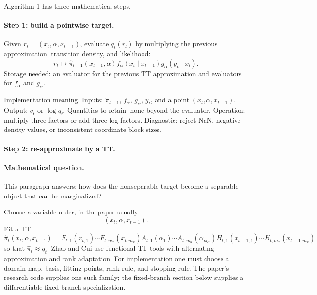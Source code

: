 \documentclass[11pt]{article}
\numberwithin{equation}{section}
\begin{document}
Algorithm 1 has three mathematical steps.

\paragraph{Step 1: build a pointwise target.}
Given \(r_t=(x_t,\alpha,x_{t-1})\), evaluate \(q_t(r_t)\) by multiplying the
previous approximation, transition density, and likelihood:
\[
    r_t\mapsto
    \widehat\pi_{t-1}(x_{t-1},\alpha)
    f_\alpha(x_t\mid x_{t-1})
    g_\alpha(y_t\mid x_t).
\]
Storage needed: an evaluator for the previous TT approximation and evaluators
for \(f_\alpha\) and \(g_\alpha\).

Implementation meaning. Inputs:
\(\widehat\pi_{t-1}\), \(f_\alpha\), \(g_\alpha\), \(y_t\), and a point
\((x_t,\alpha,x_{t-1})\).  Output: \(q_t\) or \(\log q_t\).  Quantities to retain:
none beyond the evaluator.  Operation: multiply three factors or add three log
factors.  Diagnostic: reject NaN, negative density values, or inconsistent
coordinate block sizes.

\paragraph{Step 2: re-approximate by a TT.}
\paragraph{Mathematical question.}
This paragraph answers: how does the nonseparable target become a separable
object that can be marginalized?

Choose a variable order, in the paper usually
\[
    (x_t,\alpha,x_{t-1}).
\]
Fit a TT
\begin{equation}
    \widehat\pi_t(x_t,\alpha,x_{t-1})
    =
    F_{t,1}(x_{t,1})\cdots F_{t,m_x}(x_{t,m_x})
    A_{t,1}(\alpha_1)\cdots A_{t,m_\alpha}(\alpha_{m_\alpha})
    H_{t,1}(x_{t-1,1})\cdots H_{t,m_x}(x_{t-1,m_x})
    \label{eq:p24-a1-2}
\end{equation}
so that \(\widehat\pi_t\approx q_t\).  Zhao and Cui \cite{zhao2024ttsequential} use functional TT tools with
alternating approximation and rank adaptation.  For implementation one must
choose a domain map, basis, fitting points, rank rule, and stopping rule.  The
paper's research code supplies one such family; the fixed-branch section below
supplies a differentiable fixed-branch specialization.
\end{document}
